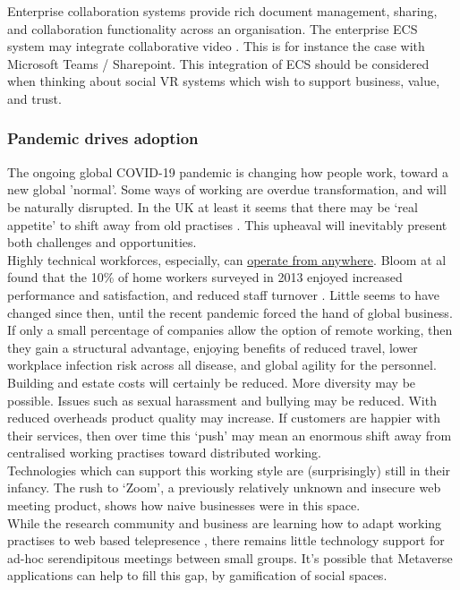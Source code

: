 Enterprise collaboration systems provide rich document management, sharing, and collaboration functionality across an organisation. The enterprise ECS system may integrate collaborative video \cite{prakash2020characteristic}. This is for instance the case with Microsoft Teams / Sharepoint. This integration of ECS should be considered when thinking about social VR systems which wish to support business, value, and trust.\\
\subsubsection{Pandemic drives adoption}
The ongoing global COVID-19 pandemic is changing how people work, toward a new global 'normal'. Some ways of working are overdue transformation, and will be naturally disrupted. In the UK at least it seems that there may be `real appetite' to shift away from old practises \cite{skychange}. This upheaval will inevitably present both challenges and opportunities.\\
Highly technical workforces, especially, can \href{https://globalworkplaceanalytics.com/telecommuting-statistics}{operate from anywhere}. Bloom at al found that the 10\% of home workers surveyed in 2013 enjoyed increased performance and satisfaction, and reduced staff turnover \cite{Bloom2015}. Little seems to have changed since then, until the recent pandemic forced the hand of global business. If only a small percentage of companies allow the option of remote working, then they gain a structural advantage, enjoying benefits of reduced travel, lower workplace infection risk across all disease, and global agility for the personnel. Building and estate costs will certainly be reduced. More diversity may be possible. Issues such as sexual harassment and bullying may be reduced.  With reduced overheads product quality may increase. If customers are happier with their services, then over time this `push' may mean an enormous shift away from centralised working practises toward distributed working. \\
Technologies which can support this working style are (surprisingly) still in their infancy. The rush to `Zoom', a previously relatively unknown and insecure \cite{aiken2020zooming} web meeting product, shows how naive businesses were in this space. \\
While the research community and business are learning how to adapt working practises to web based telepresence \cite{oeppen2020human}, there remains little technology support for ad-hoc serendipitous meetings between small groups. It's possible that Metaverse applications can help to fill this gap, by gamification of social spaces.\\

